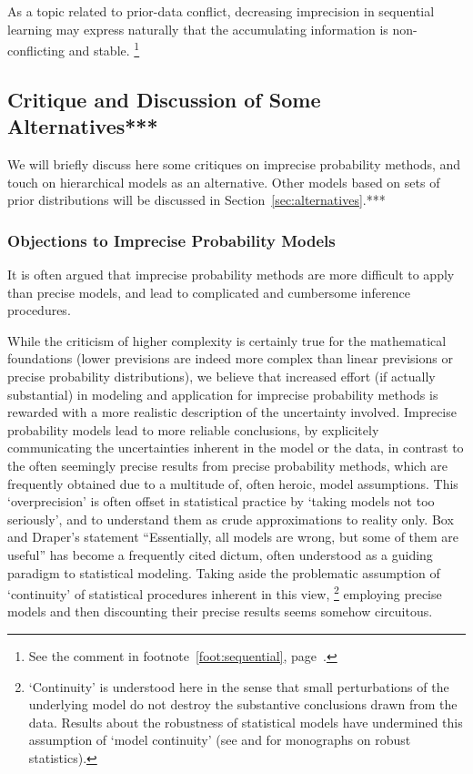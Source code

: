 As a topic related to prior-data conflict, decreasing imprecision in sequential learning
may express naturally that the accumulating information is non-conflicting and stable.%
\footnote{See the comment in footnote~\ref{foot:sequential}, page~\pageref{foot:sequential}.}


\subsection{Critique and Discussion of Some Alternatives***}
\label{sec:ip-alternatives}

We will briefly discuss here some critiques on imprecise probability methods,
and touch on hierarchical models as an alternative.
Other models based on sets of prior distributions will be discussed in Section~\ref{sec:alternatives}.***

\subsubsection{Objections to Imprecise Probability Models}
\label{sec:objections}

It is often argued that imprecise probability methods are more difficult to apply than precise models,
and lead to complicated and cumbersome inference procedures.

While the criticism of higher complexity is certainly true for the mathematical foundations
(lower previsions are indeed more complex than linear previsions or precise probability distributions),
we believe that increased effort (if actually substantial) in modeling and application 
for imprecise probability methods
is rewarded with a more realistic description of the uncertainty involved.
Imprecise probability models lead to more reliable conclusions,
by explicitely communicating the uncertainties inherent in the model or the data,
in contrast to the often seemingly precise results from precise probability methods,
which are frequently obtained due to a multitude of, often heroic, model assumptions. %
This `overprecision' is often offset in statistical practice by `taking models not too seriously',
and to understand them as crude approximations to reality only.
Box and Draper's statement ``Essentially, all models are wrong, but some of them are useful'' \parencite[p.~424]{1987:box}
has become a frequently cited dictum, often understood as a guiding paradigm to statistical modeling.
Taking aside the problematic assumption of `continuity' of statistical procedures inherent in this view,%
\footnote{`Continuity' is understood here in the sense that small perturbations of the underlying model
do not destroy the substantive conclusions drawn from the data.
Results about the robustness of statistical models have undermined this assumption of `model continuity'
(see \textcite{1981:huber} and \textcite{1986:hampel} for monographs on robust statistics).}
employing precise models and then discounting their precise results
seems somehow circuitous.

